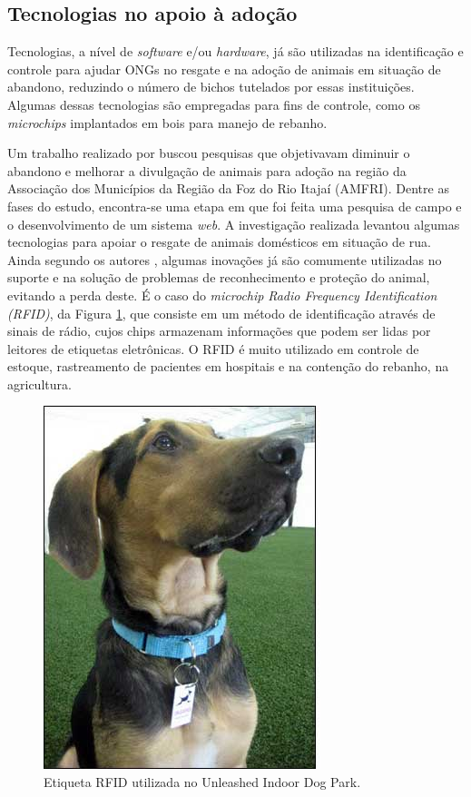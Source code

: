 \documentclass[portuguese]{textolivre}
\begin{document}
\subsection{Tecnologias no apoio à adoção}

Tecnologias, a nível de \textit{software} e/ou \textit{hardware}, já são utilizadas na identificação e controle para ajudar ONGs no resgate e na adoção de animais em situação de abandono, reduzindo o número de bichos tutelados por essas instituições. Algumas dessas tecnologias são empregadas para fins de controle, como os \textit{microchips} implantados em bois para manejo de rebanho.

Um trabalho realizado por \textcite{webmedia_estendido} buscou pesquisas que objetivavam diminuir o abandono e melhorar a divulgação de animais para adoção na região da Associação dos Municípios da Região da Foz do Rio Itajaí (AMFRI). Dentre as fases do estudo, encontra-se uma etapa em que foi feita uma pesquisa de campo e o desenvolvimento de um sistema \textit{web}. A investigação realizada levantou algumas tecnologias para apoiar o resgate de animais domésticos em situação de rua. Ainda segundo os autores \textcite{webmedia_estendido}, algumas inovações já são comumente utilizadas no suporte e na solução de problemas de reconhecimento e proteção do animal, evitando a perda deste. É o caso do \textit{microchip} \textit{Radio Frequency Identification (RFID)}, da Figura \ref{fig:003}, que consiste em um método de identificação através de sinais de rádio, cujos chips armazenam informações que podem ser lidas por leitores de etiquetas eletrônicas. O RFID é muito utilizado em controle de estoque, rastreamento de pacientes em hospitais e na contenção do rebanho, na agricultura.

\begin{figure}
	\centering
	\includegraphics[scale=0.50]{imagens/fig-003.jpeg}
	\caption{Etiqueta RFID utilizada no Unleashed Indoor Dog Park.}
	\label{fig:003}
\end{figure} 
\end{document}
